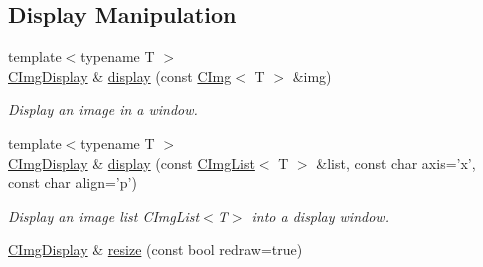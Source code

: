 \subsection*{Display Manipulation}
\label{_amgrp11e21ad5086dc6a900aa8a3ec5d951ed}
 \begin{DoxyCompactItemize}
\item 
\hypertarget{structcimg__library_1_1CImgDisplay_afd781dd620229f1178245c6e990121ae}{
{\footnotesize template$<$typename T $>$ }\\\hyperlink{structcimg__library_1_1CImgDisplay}{CImgDisplay} \& \hyperlink{structcimg__library_1_1CImgDisplay_afd781dd620229f1178245c6e990121ae}{display} (const \hyperlink{structcimg__library_1_1CImg}{CImg}$<$ T $>$ \&img)}
\label{structcimg__library_1_1CImgDisplay_afd781dd620229f1178245c6e990121ae}

\begin{DoxyCompactList}\small\item\em Display an image in a window. \item\end{DoxyCompactList}\item 
{\footnotesize template$<$typename T $>$ }\\\hyperlink{structcimg__library_1_1CImgDisplay}{CImgDisplay} \& \hyperlink{structcimg__library_1_1CImgDisplay_a43bcd9fcc817fa49152a81a2bf6cdb20}{display} (const \hyperlink{structcimg__library_1_1CImgList}{CImgList}$<$ T $>$ \&list, const char axis='x', const char align='p')
\begin{DoxyCompactList}\small\item\em Display an image list CImgList$<$T$>$ into a display window. \item\end{DoxyCompactList}\item 
\hypertarget{structcimg__library_1_1CImgDisplay_ae3fd73d5fc6a4ac9b87b1b8cdacc3833}{
\hyperlink{structcimg__library_1_1CImgDisplay}{CImgDisplay} \& \hyperlink{structcimg__library_1_1CImgDisplay_ae3fd73d5fc6a4ac9b87b1b8cdacc3833}{resize} (const bool redraw=true)}
\label{structcimg__library_1_1CImgDisplay_ae3fd73d5fc6a4ac9b87b1b8cdacc3833}


\end{DoxyCompactItemize}
